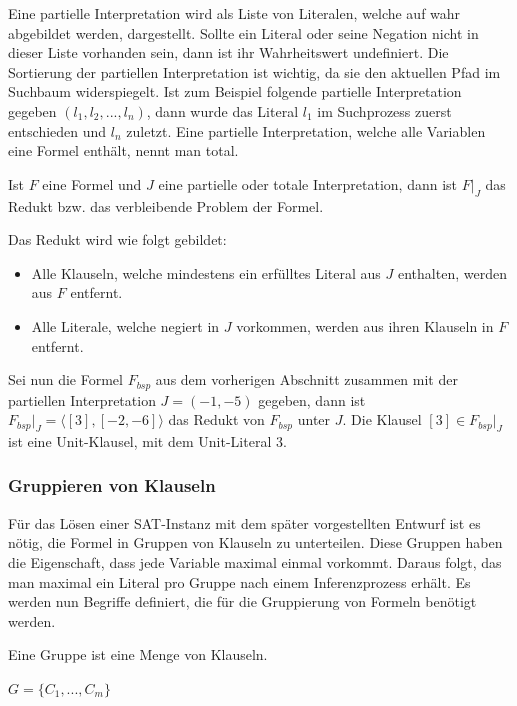   Eine partielle Interpretation wird als Liste von
  Literalen, welche auf wahr abgebildet werden,
  dargestellt. Sollte ein Literal oder seine Negation
  nicht in dieser Liste vorhanden sein, dann ist ihr Wahrheitswert
  undefiniert. Die Sortierung der partiellen
  Interpretation ist wichtig, da sie den aktuellen Pfad 
  im Suchbaum widerspiegelt. Ist zum Beispiel folgende
  partielle Interpretation gegeben $(l_1,l_2, ..., l_n)$,
  dann wurde das Literal $l_1$ im Suchprozess zuerst
  entschieden und  $l_n$ zuletzt. Eine partielle Interpretation,
  welche alle Variablen eine Formel enthält, nennt man total.\\
  \begin{definition}
    Ist $F$ eine Formel und $J$ eine partielle oder totale Interpretation, 
    dann ist $F|_J$ das Redukt bzw. das verbleibende
    Problem der Formel. 
  \end{definition}
  Das Redukt wird wie folgt gebildet:
    \begin{itemize}
      \item Alle Klauseln, welche mindestens ein erfülltes Literal
        aus $J$ enthalten, werden aus $F$ entfernt.
      \item Alle Literale, welche negiert in $J$ vorkommen,
        werden aus ihren Klauseln in $F$ entfernt.
    \end{itemize}
  Sei  nun die Formel $F_{bsp}$ aus dem
  vorherigen Abschnitt zusammen mit der partiellen
  Interpretation $J = (-1,-5)$ gegeben, dann ist
  $F_{bsp}|_J = \langle [3],[-2,-6]\rangle$
  das Redukt von $F_{bsp}$ unter $J$. Die Klausel 
  $[3] \in F_{bsp}|_J$ ist eine Unit-Klausel,
  mit dem Unit-Literal 3.


  \subsubsection{Gruppieren von Klauseln}
  Für das Lösen einer SAT-Instanz mit dem später
  vorgestellten Entwurf ist es nötig, die Formel in
  Gruppen von Klauseln zu unterteilen. Diese Gruppen
  haben die Eigenschaft, dass jede Variable maximal einmal
  vorkommt. Daraus folgt,
  das man maximal ein Literal pro Gruppe nach einem
  Inferenzprozess erhält. Es werden nun Begriffe
  definiert, die für die Gruppierung von Formeln 
  benötigt werden.
  \begin{definition}
    Eine Gruppe ist eine Menge von Klauseln.
    \begin{center}
      $G = \{C_1, ..., C_m\}$
    \end{center}
  \end{definition}

